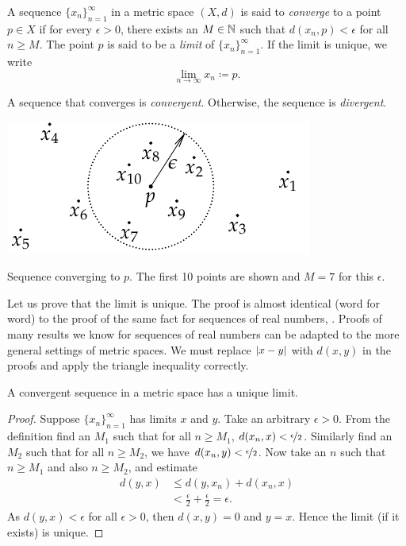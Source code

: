 \begin{defn}
A sequence $\{ x_n \}_{n=1}^\infty$ in a metric space $(X,d)$ is said
to \emph{converge} to a point
$p \in X$ if for every $\epsilon > 0$, there exists an $M \in {\mathbb{N}}$ such
that $d(x_n,p) < \epsilon$ for all $n \geq M$.  The point $p$
is said to be a \emph{limit}
of $\{ x_n \}_{n=1}^\infty$.
If the limit is unique, we write
\begin{equation*}
\lim_{n\to \infty} x_n \coloneqq p .
\end{equation*}

A sequence
that converges is \emph{convergent}.
Otherwise, the sequence is 
\emph{divergent}.
\begin{myfigureht}
\includegraphics{figures/sequence-convergence-metric}
\caption{Sequence converging to $p$.  The first 10 points 
are shown and $M=7$ for this $\epsilon$.\label{fig:sequence-convergence-metric}}
\end{myfigureht}
\end{defn}

Let us prove that the limit is unique.  The proof is almost
identical (word for word) to the proof of the same fact for sequences of
real numbers,
.
Proofs of many results we know for sequences of real numbers can be
adapted to
the more general settings of metric spaces.  We must replace $\left\lvert {x-y} \right\rvert$
with $d(x,y)$ in the proofs and apply the triangle inequality correctly.

\begin{prop} \label{prop:mslimisunique}
A convergent sequence in a metric space has a unique limit.
\end{prop}

\begin{proof}
Suppose $\{ x_n \}_{n=1}^\infty$ has limits $x$ and $y$.
Take an arbitrary $\epsilon > 0$.
From the definition find an $M_1$ such that for all $n \geq M_1$,
$d(x_n,x) < \nicefrac{\epsilon}{2}$.  Similarly find an $M_2$
such that for all $n \geq M_2$, we have
$d(x_n,y) < \nicefrac{\epsilon}{2}$.  Now take an $n$ such that
$n \geq M_1$ and also $n \geq M_2$, and estimate
\begin{equation*}
\begin{split}
d(y,x)
& \leq
d(y,x_n) + d(x_n,x) \\
& <
\frac{\epsilon}{2} + \frac{\epsilon}{2} = \epsilon .
\end{split}
\end{equation*}
As $d(y,x) < \epsilon$ for all $\epsilon > 0$, then $d(x,y) = 0$
and $y=x$.  Hence the limit (if it exists) is unique.
\end{proof}

